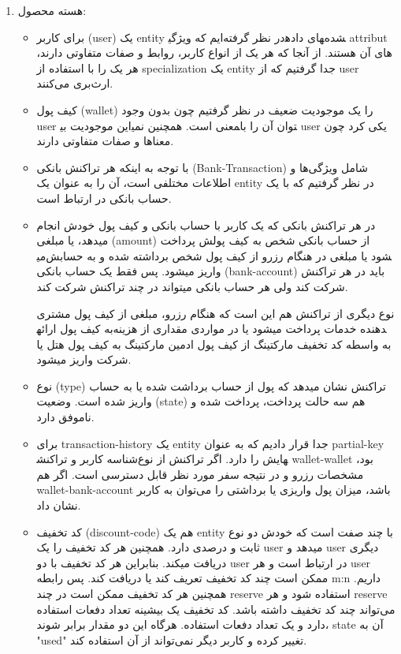 \documentclass[12pt]{exam}
\begin{document}
\begin{enumerate}
	\item هسته محصول:
	\begin{itemize}
		\item 
برای کاربر (user) یک entity در نظر گرفته‌ایم که ویژگی‎های داده‎شده attribut های آن هستند. از آنجا که هر یک از انواع کاربر، روابط و صفات متفاوتی دارند، هر یک را با استفاده از specialization یک entity جدا گرفتیم که از user ارث‌بری می‌کنند.
		\item 
کیف پول (wallet) را یک موجودیت ضعیف در نظر گرفتیم چون بدون وجود user این موجودیت بی‎معنی است. همچنین نمی‎توان آن را با user یکی کرد چون معناها و صفات متفاوتی دارند.
		\item 
با توجه به اینکه هر تراکنش بانکی (Bank-Transaction) شامل ویژگی‌ها و اطلاعات مختلفی است، آن را به عنوان یک entity در نظر گرفتیم که با یک حساب بانکی در ارتباط است.

		\item 
		در هر تراکنش بانکی که یک کاربر با حساب بانکی و کیف پول خودش انجام میدهد، یا مبلغی (amount) از حساب بانکی شخص به کیف پولش پرداخت می‎شود یا مبلغی در هنگام رزرو از کیف پول شخص برداشته شده و به حسابش واریز میشود.
		پس فقط یک حساب بانکی (bank-account) باید در هر تراکنش شرکت کند ولی هر حساب بانکی میتواند در چند تراکنش شرکت کند.
		
		نوع دیگری از تراکنش هم این است که هنگام رزرو، مبلغی از کیف پول مشتری به کیف پول ارائه‎دهنده خدمات پرداخت میشود یا در مواردی مقداری از هزینه به واسطه کد تخفیف مارکتینگ از کیف پول ادمین مارکتینگ به کیف پول هتل یا شرکت واریز میشود.
		\item 
		نوع (type) تراکنش نشان میدهد که پول از حساب برداشت شده یا به حساب واریز شده است. \linebreak وضعیت (state) هم سه حالت پرداخت، پرداخت شده و ناموفق دارد.
		\item 
برای transaction-history یک entity جدا قرار دادیم که به عنوان partial-key شناسه کاربر و تراکنش‎هایش را دارد. اگر تراکنش از نوع wallet-wallet بود، مشخصات رزرو و در نتیجه سفر مورد نظر قابل دسترسی است. اگر هم wallet-bank-account باشد، میزان پول واریزی یا برداشتی را می‌توان به کاربر نشان داد.
		\item 
کد تخفیف (discount-code) هم یک entity با چند صفت است که خودش دو نوع ثابت و درصدی دارد. همچنین هر کد تخفیف را یک user میدهد و user دیگری دریافت میکند. بنابراین هر کد تخفیف با دو user در ارتباط است و هر user ممکن است چند کد تخفیف تعریف کند یا دریافت کند. پس رابطه m:n داریم.
همچنین هر کد تخفیف ممکن است در چند reserve استفاده شود و هر reserve می‌تواند چند کد تخفیف داشته باشد.
کد تخفیف یک بیشینه تعداد دفعات استفاده دارد و یک تعداد دفعات استفاده. هرگاه این دو مقدار برابر شوند، state آن به "used" تغییر کرده و کاربر دیگر نمی‌تواند از آن استفاده کند.
		
	\end{itemize}
\end{enumerate}
\pagebreak
\end{document}
